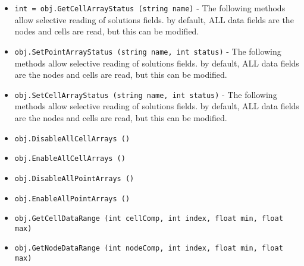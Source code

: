 \begin{itemize}
\item  \verb|int = obj.GetCellArrayStatus (string name)| -  The following methods allow selective reading of solutions fields.  by
 default, ALL data fields are the nodes and cells are read, but this can
 be modified.

\item  \verb|obj.SetPointArrayStatus (string name, int status)| -  The following methods allow selective reading of solutions fields.  by
 default, ALL data fields are the nodes and cells are read, but this can
 be modified.

\item  \verb|obj.SetCellArrayStatus (string name, int status)| -  The following methods allow selective reading of solutions fields.  by
 default, ALL data fields are the nodes and cells are read, but this can
 be modified.

\item  \verb|obj.DisableAllCellArrays ()|

\item  \verb|obj.EnableAllCellArrays ()|

\item  \verb|obj.DisableAllPointArrays ()|

\item  \verb|obj.EnableAllPointArrays ()|

\item  \verb|obj.GetCellDataRange (int cellComp, int index, float min, float max)|

\item  \verb|obj.GetNodeDataRange (int nodeComp, int index, float min, float max)|

\end{itemize}
